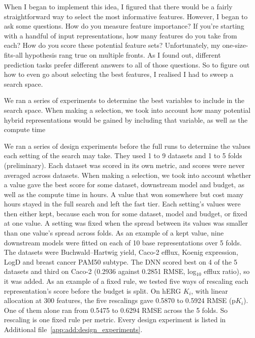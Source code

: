 When I began to implement this idea, I figured that there would be a fairly straightforward way to select the most informative features. However, I began to ask some questions. How do you measure feature importance? If you're starting with a handful of input representations, how many features do you take from each? How do you score these potential feature sets?  Unfortunately, my one-size-fits-all hypothesis rang true on multiple fronts. As I found out, different prediction tasks prefer different answers to all of those questions. So to figure out how to even go about selecting the best features, I realised I had to sweep a search space.

We ran a series of experiments to determine the best variables to include in the search space.
When making a selection, we took into account how many potential hybrid representations would be gained by including that variable, as well as the compute time

We ran a series of design experiments before the full runs to determine the values each setting of the search may take. They used 1 to 9 datasets and 1 to 5 folds (preliminary). Each dataset was scored in its own metric, and scores were never averaged across datasets. When making a selection, we took into account whether a value gave the best score for some dataset, downstream model and budget, as well as the compute time in hours. A value that won somewhere but cost many hours stayed in the full search and left the fast tier. Each setting's values were then either kept, because each won for some dataset, model and budget, or fixed at one value. A setting was fixed when the spread between its values was smaller than one value's spread across folds. As an example of a kept value, nine downstream models were fitted on each of 10 base representations over 5 folds. The datasets were Buchwald--Hartwig yield, Caco-2 efflux, Koenig expression, LogD and breast cancer PAM50 subtype. The DNN scored best on 4 of the 5 datasets and third on Caco-2 (0.2936 against 0.2851 RMSE, log$_{10}$ efflux ratio), so it was added. As an example of a fixed rule, we tested five ways of rescaling each representation's score before the budget is split. On hERG $K_i$, with linear allocation at 300 features, the five rescalings gave 0.5870 to 0.5924 RMSE (p$K_i$). One of them alone ran from 0.5475 to 0.6294 RMSE across the 5 folds. So rescaling is one fixed rule per metric. Every design experiment is listed in Additional file~\ref{app:add:design_experiments}.


